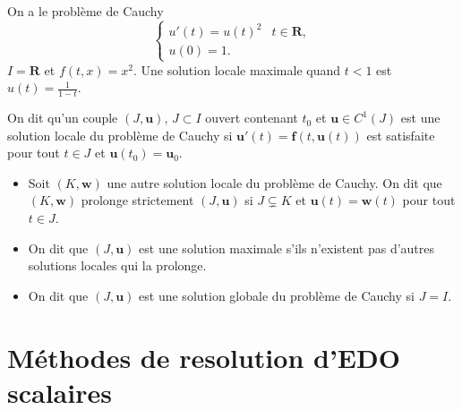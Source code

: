 \begin{example}
On a le problème de Cauchy
$$
\begin{cases}
u'(t)=u(t)^{2} & t\in \mathbf{R}, \\
u(0)=1.
\end{cases}
$$
$I=\mathbf{R}$ et $f(t,x)=x^{2}$. Une solution locale maximale quand $t<1$ est $u(t)=\frac{1}{1-t}$. 
\end{example}
\begin{definition}
On dit qu'un couple $(J,\boldsymbol{u})$, $J\subset I$ ouvert contenant $t_{0}$ et $\boldsymbol{u}\in C^{1}(J)$ est une solution locale du problème de Cauchy si $\boldsymbol{u}'(t)=\boldsymbol{f}(t,\boldsymbol{u}(t))$ est satisfaite pour tout $t\in J$ et $\boldsymbol{u}(t_{0})=\boldsymbol{u}_{0}$. 
\begin{itemize}
\item Soit $(K,\boldsymbol{w})$ une autre solution locale du problème de Cauchy. On dit que $(K,\boldsymbol{w})$ prolonge strictement $(J,\boldsymbol{u})$ si $J\subsetneq K$ et $\boldsymbol{u}(t)=\boldsymbol{w}(t)$ pour tout $t\in J$.
\item On dit que $(J,\boldsymbol{u})$ est une solution maximale s'ils n'existent pas d'autres solutions locales qui la prolonge.
\item On dit que $(J,\boldsymbol{u})$ est une solution globale du problème de Cauchy si $J=I$.
\end{itemize}
\end{definition}
\section{Méthodes de resolution d'EDO scalaires}
